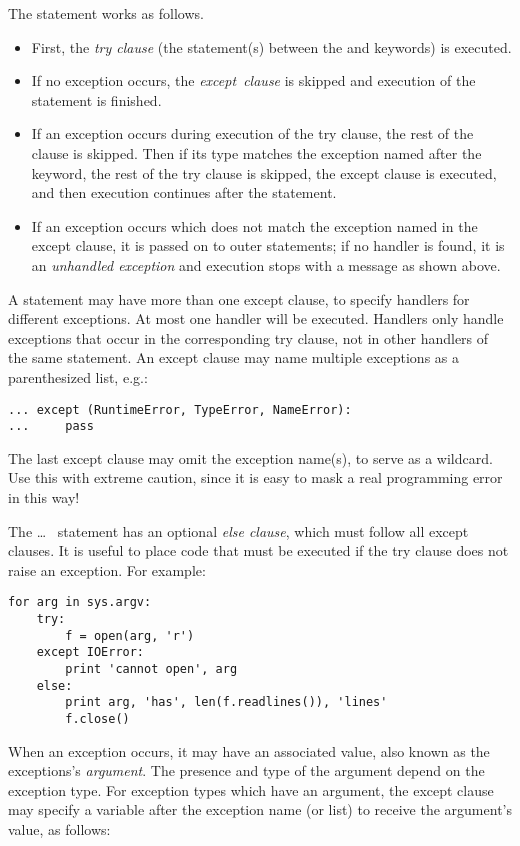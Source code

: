 \documentclass{manual}
\begin{document}
The  statement works as follows.
\begin{itemize}
\item
First, the \emph{try clause}
(the statement(s) between the  and 
keywords) is executed.
\item
If no exception occurs, the
\emph{except\ clause}
is skipped and execution of the  statement is finished.
\item
If an exception occurs during execution of the try clause,
the rest of the clause is skipped.  Then if its type matches the
exception named after the  keyword, the rest of the
try clause is skipped, the except clause is executed, and then
execution continues after the  statement.
\item
If an exception occurs which does not match the exception named in the
except clause, it is passed on to outer  statements; if
no handler is found, it is an \emph{unhandled exception}
and execution stops with a message as shown above.
\end{itemize}
A  statement may have more than one except clause, to
specify handlers for different exceptions.
At most one handler will be executed.
Handlers only handle exceptions that occur in the corresponding try
clause, not in other handlers of the same  statement.
An except clause may name multiple exceptions as a parenthesized list,
e.g.:

\begin{verbatim}
... except (RuntimeError, TypeError, NameError):
...     pass
\end{verbatim}

The last except clause may omit the exception name(s), to serve as a
wildcard.
Use this with extreme caution, since it is easy to mask a real
programming error in this way!

The  \ldots\  statement has an optional
\emph{else clause}, which must follow all except clauses.  It is
useful to place code that must be executed if the try clause does not
raise an exception.  For example:

\begin{verbatim}
for arg in sys.argv:
    try:
        f = open(arg, 'r')
    except IOError:
        print 'cannot open', arg
    else:
        print arg, 'has', len(f.readlines()), 'lines'
        f.close()
\end{verbatim}


When an exception occurs, it may have an associated value, also known as
the exceptions's \emph{argument}.
The presence and type of the argument depend on the exception type.
For exception types which have an argument, the except clause may
specify a variable after the exception name (or list) to receive the
argument's value, as follows:
\end{document}
